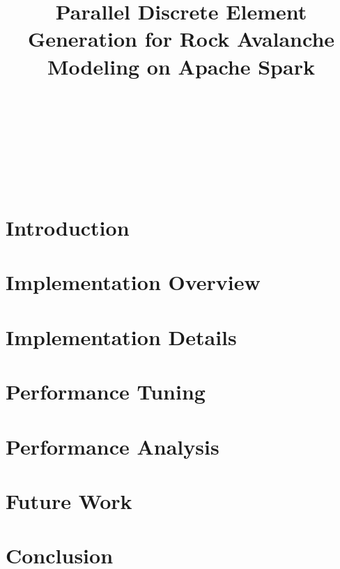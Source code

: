 \documentclass{sig-alternate}
\begin{document}
\title{Parallel Discrete Element Generation for Rock Avalanche Modeling on Apache Spark}
\author{
    \\
    \\
    \\
    \\
    \\
    \\
}

\maketitle

\section{Introduction}


\section{Implementation Overview}


\section{Implementation Details}


\section{Performance Tuning}


\section{Performance Analysis}


\section{Future Work}


\section{Conclusion}



\nocite{*}

\end{document}
